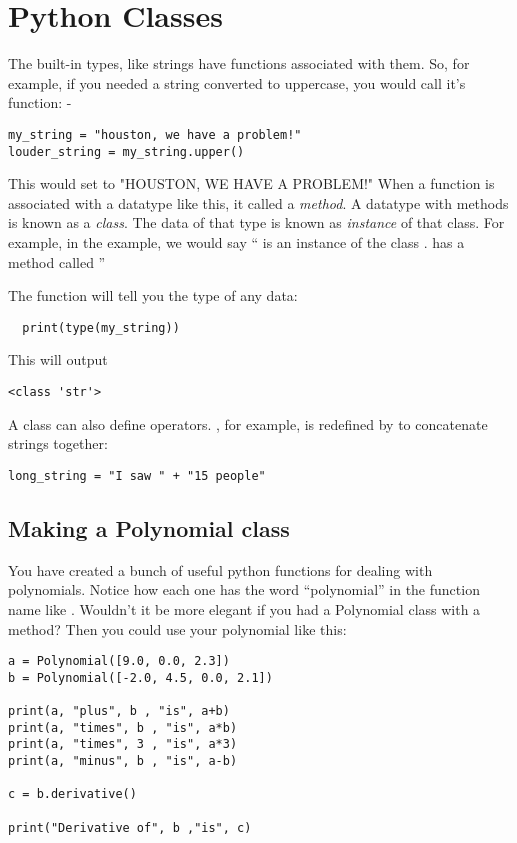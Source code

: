 \chapter{Python Classes}

The built-in types, like strings have functions associated with
them. So, for example, if you needed a string converted to uppercase,
you would call it's  function:
-
\begin{Verbatim}
my_string = "houston, we have a problem!"
louder_string = my_string.upper()
\end{Verbatim}
This would set  to "HOUSTON, WE HAVE A PROBLEM!"
When a function is associated with a datatype like this, it called a
\emph{method}. A datatype with methods is known as a \emph{class}. The
data of that type is known as \emph{instance} of that class. For
example, in the example, we would say `` is an instance of
the class .  has a method called ''

The function  will tell you the type of any data:
\begin{Verbatim}
  print(type(my_string))
\end{Verbatim}
This will output
\begin{Verbatim}
<class 'str'>
\end{Verbatim}

A class can also define operators.  \pyfunction{+}, for example, is
redefined by  to concatenate strings together:
\begin{Verbatim}
long_string = "I saw " + "15 people"
\end{Verbatim}

\section{Making a Polynomial class}

You have created a bunch of useful python functions for dealing with
polynomials. Notice how each one has the word ``polynomial'' in the
function name like .  Wouldn't it
be more elegant if you had a Polynomial class with a
 method? Then you could use your polynomial
like this:
\begin{Verbatim}
a = Polynomial([9.0, 0.0, 2.3])
b = Polynomial([-2.0, 4.5, 0.0, 2.1])

print(a, "plus", b , "is", a+b)
print(a, "times", b , "is", a*b)
print(a, "times", 3 , "is", a*3)
print(a, "minus", b , "is", a-b)

c = b.derivative()

print("Derivative of", b ,"is", c)
\end{Verbatim}

